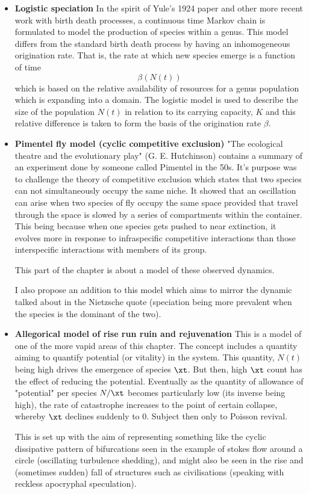 \begin{itemize}
\item  \textbf{ Logistic speciation} In the spirit of Yule's 1924 paper and other more recent work with birth death processes, \cite{nee1994extinction} a continuous time Markov chain is formulated to model the production of species within a genus.  This model differs from the standard birth death process by having an inhomogeneous origination rate.  That is, the rate at which new species emerge is a function of time 
$$\beta(N(t)) $$
which is based on the relative availability of resources for a genus population which is expanding into a domain. The logistic model is used to describe the size of the population $N(t)$ in relation to its carrying capacity,  $K$  and this relative difference is taken to form the basis of the origination rate $\beta$. 


\item \textbf{ Pimentel fly model (cyclic competitive exclusion)}
"The ecological theatre and the evolutionary play" (G.  E.  Hutchinson) contains a summary of an experiment done by someone called Pimentel in the 50s.  It's purpose was to challenge the theory of competitive exclusion which states that two species can not simultaneously occupy the same niche.  It showed that an oscillation can arise when two species of fly occupy the same space provided that travel through the space is slowed by a series of compartments within the container.  This being because when one species gets pushed to near extinction,  it evolves more in response to infraspecific competitive interactions than those interspecific interactions with members of its group. \par 
This part of the chapter is about a model of these observed dynamics.\par
I also propose an addition to this model which aims to mirror the dynamic talked about in the Nietzsche quote (speciation being more prevalent when the species is the dominant of the two). 


\item \textbf{Allegorical model of rise run ruin and rejuvenation}
This is a model of one of the more vapid areas of this chapter.  The concept includes a quantity aiming to quantify potential (or vitality) in the system. This quantity,  $N(t)$ being high drives the emergence of species $\xt$.  But then, high $\xt$ count has the effect of reducing the potential.  Eventually as the quantity of allowance of "potential" per species $N/\xt$ becomes particularly low (its inverse being high), the rate of catastrophe increases to the point of certain collapse,  whereby $\xt$ declines suddenly to 0.  Subject then only to Poisson revival.  \par 

This is set up with the aim of representing something like the cyclic dissipative pattern of bifurcations seen in the example of stokes flow around a circle (oscillating turbulence shedding), and might also be seen in the rise and (sometimes sudden) fall of structures such as civilisations (speaking with reckless apocryphal speculation).  

\end{itemize}


